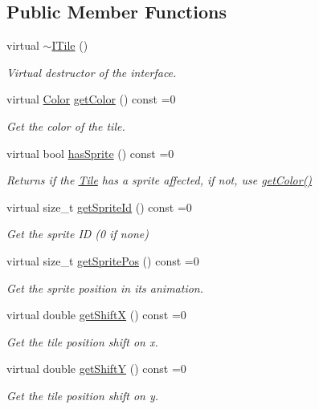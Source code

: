 \subsection*{Public Member Functions}
\begin{DoxyCompactItemize}
\item 
virtual \hyperlink{classarcade_1_1_i_tile_a45fb2120945fbddafb4b963d969a5b80}{$\sim$\+I\+Tile} ()
\begin{DoxyCompactList}\small\item\em Virtual destructor of the interface. \end{DoxyCompactList}\item 
virtual \hyperlink{unionarcade_1_1_color}{Color} \hyperlink{classarcade_1_1_i_tile_adb20cb553bc2ce17dc23125eb70b8329}{get\+Color} () const =0
\begin{DoxyCompactList}\small\item\em Get the color of the tile. \end{DoxyCompactList}\item 
virtual bool \hyperlink{classarcade_1_1_i_tile_ab2d6a5f8d4cfc6c606b8ad13d8dd88a4}{has\+Sprite} () const =0
\begin{DoxyCompactList}\small\item\em Returns if the \hyperlink{classarcade_1_1_tile}{Tile} has a sprite affected, if not, use \hyperlink{classarcade_1_1_i_tile_adb20cb553bc2ce17dc23125eb70b8329}{get\+Color()} \end{DoxyCompactList}\item 
virtual size\+\_\+t \hyperlink{classarcade_1_1_i_tile_a4c09e2ac12d75fe12e3d4d1ca4e08150}{get\+Sprite\+Id} () const =0
\begin{DoxyCompactList}\small\item\em Get the sprite ID (0 if none) \end{DoxyCompactList}\item 
virtual size\+\_\+t \hyperlink{classarcade_1_1_i_tile_a3e5cec4407ef6afb7e10d82fb1c93f5e}{get\+Sprite\+Pos} () const =0
\begin{DoxyCompactList}\small\item\em Get the sprite position in it\textquotesingle{}s animation. \end{DoxyCompactList}\item 
virtual double \hyperlink{classarcade_1_1_i_tile_aaa83bd96759c2c9f369be4b00b8a72d2}{get\+ShiftX} () const =0
\begin{DoxyCompactList}\small\item\em Get the tile position shift on x. \end{DoxyCompactList}\item 
virtual double \hyperlink{classarcade_1_1_i_tile_af7ca3cfb598eda00ac5b5f15f096e32f}{get\+ShiftY} () const =0
\begin{DoxyCompactList}\small\item\em Get the tile position shift on y. \end{DoxyCompactList}\end{DoxyCompactItemize}


